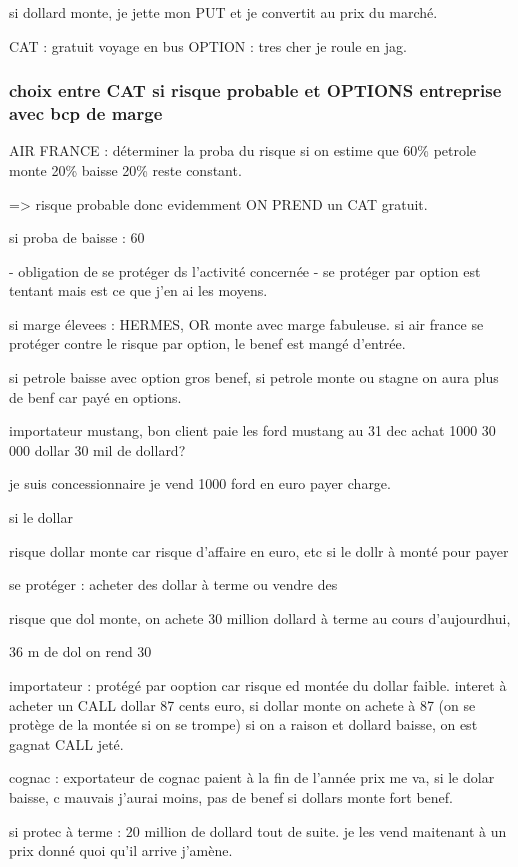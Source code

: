 \documentclass[a4paper,12pt]{article}
\begin{document}
 si dollard monte, je jette mon PUT et je convertit au prix du marché.
 
 
 CAT : gratuit voyage en bus
 OPTION : tres cher je roule en jag.
 
 
 \subsubsection{choix entre CAT si risque probable et OPTIONS entreprise avec bcp de marge}


AIR FRANCE : 
déterminer la proba du risque 
si on estime que 60\% petrole monte  20\% baisse  20\% reste constant.

=> risque probable donc evidemment ON PREND un CAT gratuit.

si proba de baisse : 60%

- obligation de se protéger ds l'activité concernée
- se protéger par option est tentant mais est ce que j'en ai les moyens.

si marge élevees : HERMES, OR monte avec marge fabuleuse.
si air france se protéger contre le risque par option, le benef est mangé d'entrée.


si petrole baisse avec option gros benef, si petrole monte ou stagne on aura plus de benf car payé en options.


importateur mustang, bon client paie les ford mustang au 31 dec achat 1000 30 000 dollar 30 mil de dollard?

je suis concessionnaire je vend 1000 ford en euro payer charge.

si le dollar

risque dollar monte car risque d'affaire en euro, etc si le dollr à monté pour payer

se protéger : acheter des dollar à terme ou vendre des 

risque que dol monte, on achete 30 million dollard à terme au cours d'aujourdhui,

36 m de dol on rend 30


importateur : protégé par ooption car risque ed montée du dollar faible.
interet à acheter un CALL dollar  87 cents euro, si dollar monte on achete à 87 (on se protège de la montée si on se trompe)
si on a raison et dollard baisse, on est gagnat CALL jeté.


cognac : exportateur de cognac paient à la fin de l'année
prix me va, si le dolar baisse, c mauvais j'aurai moins, pas de benef
si dollars monte fort benef.

si protec à terme : 20 million de dollard tout de suite.
je les vend maitenant à un prix donné quoi qu'il arrive j'amène.
\end{document}
